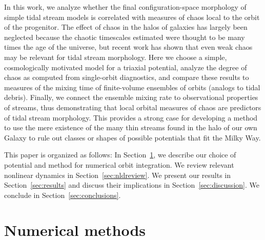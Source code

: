 \documentclass[letterpaper,12pt,preprint]{aastex}
\begin{document}
In this work, we analyze whether the final configuration-space morphology of simple tidal stream models is correlated with measures of chaos local to the orbit of the progenitor. The effect of chaos in the halos of galaxies has largely been neglected because the chaotic timescales estimated were thought to be many times the age of the universe, but recent work has shown that even weak chaos may be relevant for tidal stream morphology. Here we choose a simple, cosmologically motivated model for a triaxial potential, analyze the degree of chaos as computed from single-orbit diagnostics, and compare these results to measures of the mixing time of finite-volume ensembles of orbits (analogs to tidal debris). Finally, we connect the ensemble mixing rate to observational properties of streams, thus demonstrating that local orbital measures of chaos are predictors of tidal stream morphology. This provides a strong case for developing a method to use the mere existence of the many thin streams found in the halo of our own Galaxy to rule out classes or shapes of possible potentials that fit the Milky Way.

This paper is organized as follows: In Section~\ref{sec:methods}, we describe our choice of potential and method for numerical orbit integration. We review relevant nonlinear dynamics in Section~\ref{sec:nldreview}. We present our results in Section~\ref{sec:results} and discuss their implications in Section~\ref{sec:discussion}. We conclude in Section~\ref{sec:conclusions}.




\section{Numerical methods}\label{sec:methods}
\end{document}

